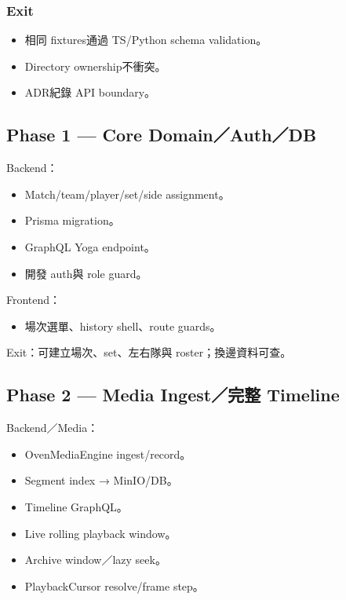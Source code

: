 \documentclass[
  9pt,
  a4paper,
]{article}
\providecommand{\tightlist}{%
  \setlength{\itemsep}{0pt}\setlength{\parskip}{0pt}}
\begin{document}
\subsubsection{Exit}\label{exit}

\begin{itemize}
\tightlist
\item
  相同 fixtures通過 TS/Python schema validation。
\item
  Directory ownership不衝突。
\item
  ADR紀錄 API boundary。
\end{itemize}

\subsection{Phase 1 --- Core
Domain／Auth／DB}\label{phase-1--core-domainauthdb}

Backend：

\begin{itemize}
\tightlist
\item
  Match/team/player/set/side assignment。
\item
  Prisma migration。
\item
  GraphQL Yoga endpoint。
\item
  開發 auth與 role guard。
\end{itemize}

Frontend：

\begin{itemize}
\tightlist
\item
  場次選單、history shell、route guards。
\end{itemize}

Exit：可建立場次、set、左右隊與 roster；換邊資料可查。

\subsection{Phase 2 --- Media Ingest／完整
Timeline}\label{phase-2--media-ingestux5b8cux6574-timeline}

Backend／Media：

\begin{itemize}
\tightlist
\item
  OvenMediaEngine ingest/record。
\item
  Segment index → MinIO/DB。
\item
  Timeline GraphQL。
\item
  Live rolling playback window。
\item
  Archive window／lazy seek。
\item
  PlaybackCursor resolve/frame step。
\end{itemize}
\end{document}

